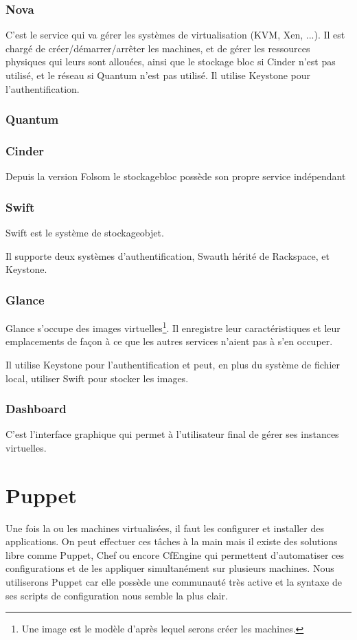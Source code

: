\documentclass[a4paper,oneside]{report}
\begin{document}
\subsubsection{Nova}
C'est le service qui va gérer les systèmes de \gls{virtualisation} (KVM, Xen, ...).
Il est chargé de créer/démarrer/arrêter les machines, et de gérer les ressources physiques qui leurs sont allouées, ainsi que le stockage bloc si Cinder n'est pas utilisé, et le réseau si Quantum n'est pas utilisé.\newline
Il utilise Keystone pour l'authentification.


\subsubsection{Quantum}


\subsubsection{Cinder}
Depuis la version Folsom le \gls{stockagebloc} possède son propre service indépendant 



\subsubsection{Swift}
Swift est le système de \gls{stockageobjet}. 

Il supporte deux systèmes d'authentification, Swauth hérité de Rackspace, et Keystone.

\subsubsection{Glance}
Glance s'occupe des images virtuelles\footnote{Une image est le modèle d'après lequel serons créer les machines.}.
Il enregistre leur caractéristiques et leur emplacements de façon à ce que les autres services n'aient pas à s'en occuper.

Il utilise Keystone pour l'authentification et peut, en plus du système de fichier local, utiliser Swift pour stocker les images.

\subsubsection{Dashboard}
C'est l'interface graphique qui permet à l'utilisateur final de gérer ses instances virtuelles.

\section{Puppet}
Une fois la ou les machines virtualisées, il faut les configurer et installer des applications. On peut effectuer ces tâches à la main mais il existe des solutions libre comme Puppet, Chef ou encore CfEngine qui permettent d'automatiser ces configurations et de les appliquer simultanément sur plusieurs machines.
Nous utiliserons Puppet car elle possède une communauté très active et la syntaxe de ses scripts de configuration nous semble la plus clair.
\end{document}

